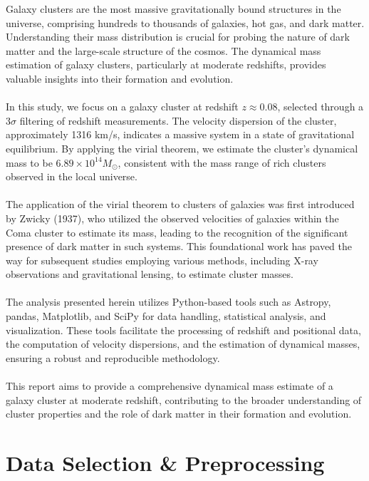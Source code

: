\documentclass[12pt]{article}
\begin{document}
Galaxy clusters are the most massive gravitationally bound structures in the universe, comprising hundreds to thousands of galaxies, 
hot gas, and dark matter. Understanding their mass distribution is crucial for probing the nature of dark matter and the large-scale 
structure of the cosmos. The dynamical mass estimation of galaxy clusters, particularly at moderate redshifts, provides valuable insights 
into their formation and evolution.\\
\\
In this study, we focus on a galaxy cluster at redshift $z \approx 0.08$, selected through a 3$\sigma$ filtering of redshift measurements. 
The velocity dispersion of the cluster, approximately 1316 km/s, indicates a massive system in a state of gravitational equilibrium. 
By applying the virial theorem, we estimate the cluster's dynamical mass to be $6.89 \times 10^{14} M_\odot$, consistent with the mass 
range of rich clusters observed in the local universe.\\
\\
The application of the virial theorem to clusters of galaxies was first introduced by Zwicky (1937), who utilized the observed velocities 
of galaxies within the Coma cluster to estimate its mass, leading to the recognition of the significant presence of dark matter in such systems. 
This foundational work has paved the way for subsequent studies employing various methods, including X-ray observations and gravitational lensing, 
to estimate cluster masses.\\
\\
The analysis presented herein utilizes Python-based tools such as Astropy, pandas, Matplotlib, and SciPy for data handling, statistical analysis, and visualization. 
These tools facilitate the processing of redshift and positional data, the computation of velocity dispersions, and the estimation of dynamical masses, ensuring a 
robust and reproducible methodology.\\
\\
This report aims to provide a comprehensive dynamical mass estimate of a galaxy cluster at moderate redshift, contributing to the broader understanding of cluster 
properties and the role of dark matter in their formation and evolution.

\newpage
\section{Data Selection \& Preprocessing}
\end{document}
